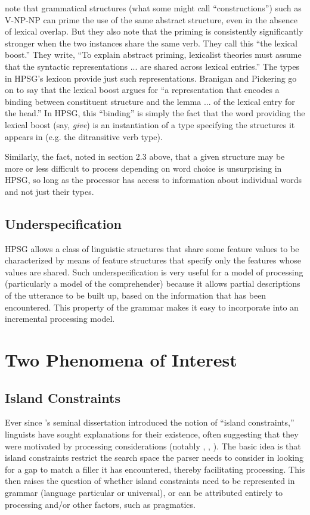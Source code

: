 \documentclass[a4paper]{article}
\begin{document}
\citet{BraniganPickering2017} note that grammatical structures (what some might call ``constructions'') such as V-NP-NP can prime the use of the same abstract structure, even in the absence of lexical overlap.  But they also note that the priming is consistently significantly stronger when the two instances share the same verb.  They call this ``the lexical boost.''  They write, ``To explain abstract
priming, lexicalist theories must assume that the syntactic
representations ...
are shared across lexical entries.'' The types in HPSG's lexicon provide just such representations.  Branigan and Pickering go on to say that the lexical boost argues for ``a representation that
encodes a binding between constituent structure and the
lemma ... of the lexical entry for the
head.''  In HPSG, this ``binding'' is simply the fact that the word providing the lexical boost (say, {\it give}) is an instantiation of a type specifying the structures it appears in (e.g. the ditransitive verb type).

Similarly, the fact, noted in section 2.3 above, that a given structure may be more or less difficult to process depending on word choice is unsurprising in HPSG, so long as the processor has access to information about individual words and not just their types.   
\subsection{Underspecification}

HPSG allows a class of linguistic structures that share some feature values to be characterized by means of feature structures that specify only the features whose values are shared.  Such underspecification is very useful for a model of processing (particularly a model of the comprehender) because it allows partial descriptions of the utterance to be built up, based on the information that has been encountered.  This property of the grammar makes it easy to incorporate into an incremental processing model.

\section{Two Phenomena of Interest}
\subsection{Island Constraints}

Ever since \citeauthor{Ross67}'s seminal dissertation \citeyearpar{Ross67} introduced the notion of ``island constraints,'' linguists have sought explanations for their existence, often suggesting that they were motivated by processing considerations (notably \citet{Grosu72-u}, \citet{Fodor83}, \citet{Deane91}).  The basic idea is that island constraints restrict the search space the parser needs to consider in looking for a gap to match a filler it has encountered, thereby facilitating processing.  This then raises the question of whether island constraints need to be represented in grammar (language particular or universal), or can be attributed entirely to processing and/or other factors, such as pragmatics.
\end{document}
